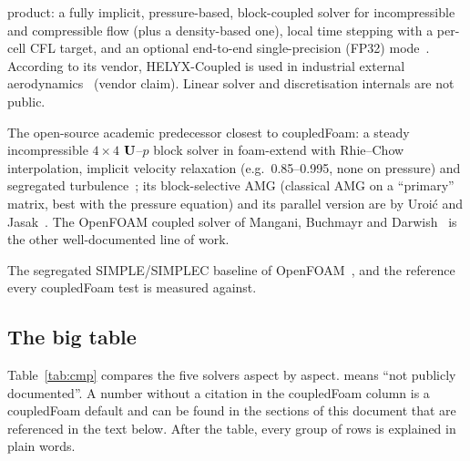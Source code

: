 \begin{description}
  product: a fully implicit, pressure-based, block-coupled solver for
  incompressible and compressible flow (plus a density-based one),
  local time stepping with a per-cell CFL target, and an optional
  end-to-end single-precision (FP32) mode~\cite{cmp-HelyxCoupled,
  cmp-HelyxTechniques}. According to its vendor, HELYX-Coupled is used in
  industrial external aerodynamics~\cite{cmp-HelyxCoupled} (vendor claim).
  Linear solver and discretisation internals are not public.
\item[foam-extend \code{pUCoupledFoam}.] The open-source academic
  predecessor closest to coupledFoam: a steady incompressible
  $4\times4$ $\mathbf{U}$--$p$ block solver in foam-extend with Rhie--Chow
  interpolation, implicit velocity relaxation (e.g.\ 0.85--0.995, none on
  pressure) and segregated turbulence~\cite{cmp-Jareteg2014,cmp-Jareteg2015};
  its block-selective AMG (classical AMG on a ``primary'' matrix, best with
  the pressure equation) and its parallel version are by Uroi\'c and
  Jasak~\cite{Uroic2018,Uroic2021}. The OpenFOAM coupled solver of Mangani,
  Buchmayr and Darwish~\cite{Mangani2014a,Mangani2014b} is the other
  well-documented line of work.
\item[OpenFOAM \code{simpleFoam}.] The segregated SIMPLE/SIMPLEC baseline
  of OpenFOAM~\cite{Patankar1972,VanDoormaal1984,OpenFOAMv2606}, and the
  reference every coupledFoam test is measured against.
\end{description}

\subsection{The big table}\label{sec:cmp-table}

Table~\ref{tab:cmp} compares the five solvers aspect by aspect.
\cmpnpd{} means ``not publicly documented''. A number without a citation in
the coupledFoam column is a coupledFoam default and can be found in the
sections of this document that are referenced in the text below. After the
table, every group of rows is explained in plain words.

